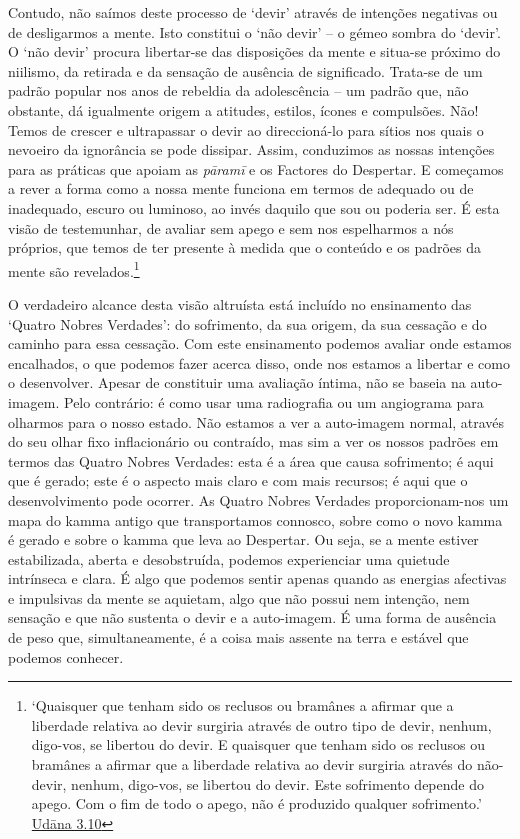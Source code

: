 Contudo, não saímos deste processo de `devir' através de intenções negativas ou de desligarmos a mente. Isto constitui o `não devir' -- o gémeo sombra do `devir'. O `não devir' procura libertar-se das disposições da mente e situa-se próximo do niilismo, da retirada e da sensação de ausência de significado. Trata-se de um padrão popular nos anos de rebeldia da adolescência -- um padrão que, não obstante, dá igualmente origem a atitudes, estilos, ícones e compulsões. Não! Temos de crescer e ultrapassar o devir ao direccioná-lo para sítios nos quais o nevoeiro da ignorância se pode dissipar. Assim, conduzimos as nossas intenções para as práticas que apoiam as \emph{pāramī} e os Factores do Despertar. E começamos a rever a forma como a nossa mente funciona em termos de adequado ou de inadequado, escuro ou luminoso, ao invés daquilo que sou ou poderia ser. É esta visão de testemunhar, de avaliar sem apego e sem nos espelharmos a nós próprios, que temos de ter presente à medida que o conteúdo e os padrões da mente são revelados.\footnote{`Quaisquer que tenham sido os reclusos ou bramânes a afirmar que a liberdade relativa ao devir surgiria através de outro tipo de devir, nenhum, digo-vos, se libertou do devir. E quaisquer que tenham sido os reclusos ou bramânes a afirmar que a liberdade relativa ao devir surgiria através do não-devir, nenhum, digo-vos, se libertou do devir. Este sofrimento depende do apego. Com o fim de todo o apego, não é produzido qualquer sofrimento.' \href{https://suttacentral.net/ud3.10}{Udāna 3.10}}

O verdadeiro alcance desta visão altruísta está incluído no ensinamento das `Quatro Nobres Verdades': do sofrimento, da sua origem, da sua cessação e do caminho para essa cessação. Com este ensinamento podemos avaliar onde estamos encalhados, o que podemos fazer acerca disso, onde nos estamos a libertar e como o desenvolver. Apesar de constituir uma avaliação íntima, não se baseia na auto-imagem. Pelo contrário: é como usar uma radiografia ou um angiograma para olharmos para o nosso estado. Não estamos a ver a auto-imagem normal, através do seu olhar fixo inflacionário ou contraído, mas sim a ver os nossos padrões em termos das Quatro Nobres Verdades: esta é a área que causa sofrimento; é aqui que é gerado; este é o aspecto mais claro e com mais recursos; é aqui que o desenvolvimento pode ocorrer. As Quatro Nobres Verdades proporcionam-nos um mapa do kamma antigo que transportamos connosco, sobre como o novo kamma é gerado e sobre o kamma que leva ao Despertar. Ou seja, se a mente estiver estabilizada, aberta e desobstruída, podemos experienciar uma quietude intrínseca e clara. É algo que podemos sentir apenas quando as energias afectivas e impulsivas da mente se aquietam, algo que não possui nem intenção, nem sensação e que não sustenta o devir e a auto-imagem. É uma forma de ausência de peso que, simultaneamente, é a coisa mais assente na terra e estável que podemos conhecer.

